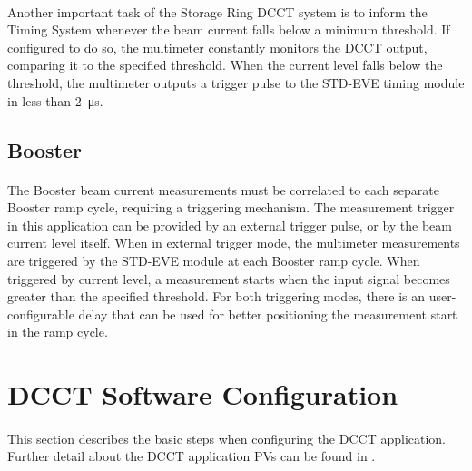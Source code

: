 \documentclass[openany]{article}
\begin{document}
		\paragraph{} Another important task of the Storage Ring DCCT system is to inform the Timing System whenever the beam current falls below a minimum threshold. If configured to do so, the multimeter constantly monitors the DCCT output, comparing it to the specified threshold. When the current level falls below the threshold, the multimeter outputs a trigger pulse to the STD-EVE timing module in less than \SI{2}{\micro\second}.

	\subsection{Booster} 

		\paragraph{} The Booster beam current measurements must be correlated to each separate Booster ramp cycle, requiring a triggering mechanism. The measurement trigger in this application can be provided by an external trigger pulse, or by the beam current level itself. When in external trigger mode, the multimeter measurements are triggered by the STD-EVE module at each Booster ramp cycle. When triggered by current level, a measurement starts when the input signal becomes greater than the specified threshold. For both triggering modes, there is an user-configurable delay that can be used for better positioning the measurement start in the ramp cycle.

\section{DCCT Software Configuration}

	\paragraph{} This section describes the basic steps when configuring the DCCT application. Further detail about the DCCT application PVs can be found in \emph{}.

	\bigskip
	\noindent{}
\end{document}
